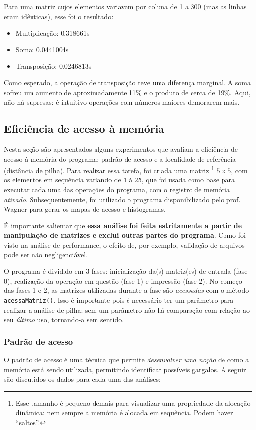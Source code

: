 \documentclass{article}
\def\code#1{\texttt{#1}}
\begin{document}
Para uma matriz cujos elementos variavam por coluna de 1 a 300 (mas as linhas eram idênticas), esse foi o resultado:

\begin{itemize}
    \item Multiplicação: 0.318661s
    \item Soma: 0.0441004s
    \item Transposição: 0.0246813s
\end{itemize}

Como esperado, a operação de transposição teve uma diferença marginal. A soma sofreu um aumento de aproximadamente 11\% e o produto de cerca de 19\%. Aqui, não há supresas: é intuitivo operações com números maiores demorarem mais.

\subsection{Eficiência de acesso à memória}

Nesta seção são apresentados alguns experimentos que avaliam a eficiência de acesso à memória do programa: padrão de acesso e a localidade de referência (distância de pilha). Para realizar essa tarefa, foi criada uma matriz \footnote{Esse tamanho é pequeno demais para visualizar uma propriedade da alocação dinâmica: nem sempre a memória é alocada em sequência. Podem haver ``saltos''.} \( 5 \times 5 \), com os elementos em sequência variando de 1 à 25, que foi usada como base para executar cada uma das operações do programa, com o registro de memória \textit{ativado}. Subsequentemente, foi utilizado o programa disponibilizado pelo prof. Wagner para gerar os mapas de acesso e histogramas.

É importante salientar que \textbf{essa análise foi feita estritamente a partir de manipulação de matrizes e exclui outras partes do programa}. Como foi visto na análise de performance, o efeito de, por exemplo, validação de arquivos pode ser não negligenciável.

O programa é dividido em 3 fases: inicialização da(s) matriz(es) de entrada (fase 0), realização da operação em questão (fase 1) e impressão (fase 2). No começo das fases 1 e 2, as matrizes utilizadas durante a fase são \textit{acessadas} com o método \code{acessaMatriz()}. Isso é importante pois é necessário ter um parâmetro para realizar a análise de pilha: sem um parâmetro não há comparação com relação ao seu \textit{último} uso, tornando-a sem sentido.

\subsubsection{Padrão de acesso}
O padrão de acesso é uma técnica que permite \textit{desenvolver uma noção} de como a memória está sendo utilizada, permitindo identificar possíveis gargalos. A seguir são discutidos os dados para cada uma das análises:
\end{document}
